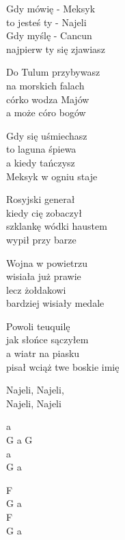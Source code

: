 \begin{text}
    Gdy mówię - Meksyk\\
    to jesteś ty - Najeli\\
    Gdy myślę - Cancun\\
    najpierw ty się zjawiasz

    Do Tulum przybywasz\\
    na morskich falach\\
    córko wodza Majów\\
    a może córo bogów

    Gdy się uśmiechasz\\
    to laguna śpiewa\\
    a kiedy tańczysz\\
    Meksyk w ogniu staje

    Rosyjski generał\\
    kiedy cię zobaczył\\
    szklankę wódki haustem\\
    wypił przy barze

    Wojna w powietrzu\\
    wisiała już prawie\\
    lecz żołdakowi\\
    bardziej wisiały medale

    Powoli teuquilę\\
    jak słońce sączyłem\\
    a wiatr na piasku\\
    pisał wciąż twe boskie imię

    Najeli, Najeli,\\
    Najeli, Najeli
\end{text}
\begin{chord}
    a\\
    G a G\\
    a\\
    G a

    F\\
    G a\\
    F\\
    G a
\end{chord}